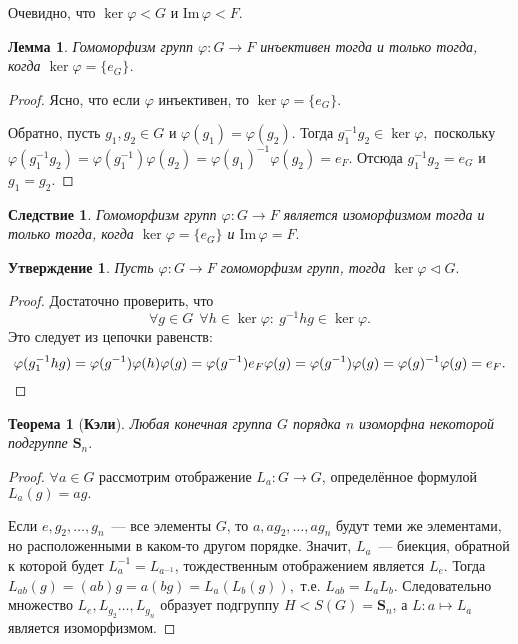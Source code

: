 \documentclass[a4paper, 14pt]{extarticle}
\newcommand{\n}{\par}
\newcommand{\symmetrical}{\mathbf{S}}
\newcommand{\im}{\mathrm{Im} \,}
\renewcommand{\phi}{\varphi}
\theoremstyle{definition}
\theoremstyle{plain}
\newtheorem*{theorem*}{Теорема}
\numberwithin{theorem}{section}
\numberwithin{definition}{section}
\newtheorem{statement}{Утверждение}
\numberwithin{statement}{section}
\newtheorem{lemma}{Лемма}
\numberwithin{lemma}{section}
\newtheorem*{consequence*}{Следствие}
\numberwithin{consequence}{section}
\begin{document}
	Очевидно, что $\ker \phi < G$ и Im$\, \phi < F.$
	\begin{lemma}
		Гомоморфизм групп ${\phi: G \rightarrow F}$ инъективен тогда и только тогда, когда  $\ker \phi = \{e_G\}$.
	\end{lemma}
	\begin{proof}
		Ясно, что если $\phi$ инъективен, то $\ker \phi = \{e_G\}.$ \n
		Обратно, пусть ${g_1, g_2 \in G}$ и ${\phi(g_1) = \phi(g_2).}$ Тогда ${g^{-1}_1g_2 \in \ker \phi,}$ поскольку ${\phi(g^{-1}_1g_2) = \phi(g^{-1}_1) \phi(g_2) = \phi(g_1)^{-1} \phi(g_2) = e_F.}$ Отсюда $g^{-1}_1g_2 = e_G$ и $g_1 = g_2.$
	\end{proof}
	\begin{consequence*}
		Гомоморфизм групп ${\phi: G \rightarrow F}$ является изоморфизмом тогда и только тогда, когда ${\ker \phi = \{e_G\}}$ и ${\im \phi = F.}$
	\end{consequence*}
	\begin{statement}
		Пусть ${\phi: G \rightarrow F}$ гомоморфизм групп, тогда ${\ker \phi \lhd G.}$
	\end{statement}
	\begin{proof}
		Достаточно проверить, что
		\begin{equation*}
			\forall g \in G \ \ \forall h \in \ker \phi{:} \ g^{-1}hg \in \ker \phi.
		\end{equation*}
		Это следует из цепочки равенств:
		\begin{equation*}
			\phi(g^{-1}_1hg) = \phi(g^{-1}) \phi(h) \phi(g) = \phi(g^{-1}) e_F \phi(g) = \phi(g^{-1}) \phi(g) = \phi(g)^{-1} \phi(g) = e_F. \qedhere
		\end{equation*}
	\end{proof}
        \newpage
        \begin{theorem*}[\textbf{Кэли}]
		Любая конечная группа $G$ порядка $n$ изоморфна некоторой подгруппе $\symmetrical_n.$
	\end{theorem*}
	\begin{proof}
		  $\forall {a \in G}$ рассмотрим отображение ${L_a : G \rightarrow G}$, определённое формулой ${L_a(g) = ag.}$\n
          Если $e, g_2,\ldots,g_n$~--- все элементы $G$, то $a, ag_2,\ldots,ag_n$ будут теми же элементами, но расположенными в каком-то другом порядке. Значит, $L_a$~--- биекция, обратной к которой будет $L_a^{-1} = L_{a^{-1}}$, тождественным отображением является $L_e$. Тогда $L_{ab}(g) = (ab)g = a(bg) = L_a(L_b(g)),$ т.е. $L_{ab} = L_a L_b.$ Следовательно множество $L_e, L_{g_2}\ldots,L_{g_n}$ образует подгруппу ${H < S(G) = \symmetrical_n}$, а ${L : a \mapsto L_a}$ является изоморфизмом.
	\end{proof}
	\newpage
\end{document}
